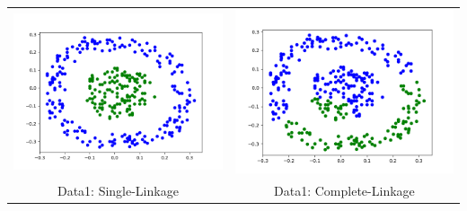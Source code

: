 \documentclass{article}
\begin{document}
\begin{tabular}{c|c}

\includegraphics[scale=0.4]{hac_images/data1single.png}&\includegraphics[scale=0.4]{hac_images/data1complete.png}\\
{Data1: Single-Linkage}&{Data1: Complete-Linkage}\\

\end{tabular}
\end{document}
